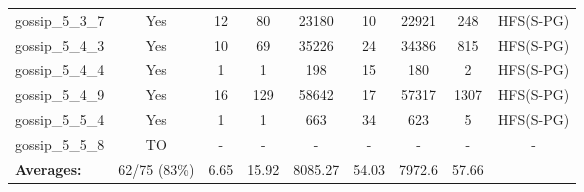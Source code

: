 \documentclass{article}
\begin{document}
\begin{tabular}{lcccccccc}
gossip\_5\_3\_7 & Yes & 12 & 80 & 23180 & 10 & 22921 & 248 & HFS(S-PG) \\
gossip\_5\_4\_3 & Yes & 10 & 69 & 35226 & 24 & 34386 & 815 & HFS(S-PG) \\
gossip\_5\_4\_4 & Yes & 1 & 1 & 198 & 15 & 180 & 2 & HFS(S-PG) \\
gossip\_5\_4\_9 & Yes & 16 & 129 & 58642 & 17 & 57317 & 1307 & HFS(S-PG) \\
gossip\_5\_5\_4 & Yes & 1 & 1 & 663 & 34 & 623 & 5 & HFS(S-PG) \\
gossip\_5\_5\_8 & TO & - & - & - & - & - & - & - \\
\textbf{Averages:} & 62/75 (83\%) & 6.65 & 15.92 & 8085.27 & 54.03 & 7972.6 & 57.66 & \\
\bottomrule
\end{tabular}
\\[0.7cm]
\end{document}

